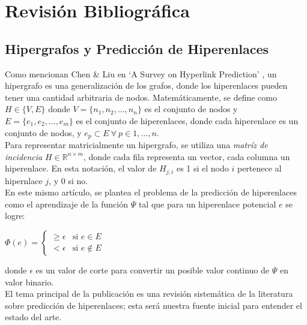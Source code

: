 \chapter{Revisión Bibliográfica}

\section{Hipergrafos y Predicción de Hiperenlaces}

Como mencionan Chen \& Liu en `A Survey on Hyperlink Prediction' \cite{Chen_2024}, un hipergrafo es una generalización de los grafos, donde los hiperenlaces pueden tener una cantidad arbitraria de nodos.
Matemáticamente, se define como \begin{math} H \in \{V,E\}\end{math} donde $V=\{n_{1},n_{2},...,n_{n}\}$ es el conjunto de nodos y $E=\{e_{1},e_{2},\dots,e_{m}\}$ es el conjunto de hiperenlaces, donde cada hiperenlace es un conjunto de nodos, y $e_{p} \subset E \: \forall \: p \in 1,\dots,n$.\\

Para representar matricialmente un hipergrafo, se utiliza una \textit{matríz de incidencia} $H \in \mathbb{R}^{n \times m}$, donde cada fila representa un vector, cada columna un hiperenlace. En esta notación, el valor de $H_{j,i}$ es 1 si el nodo $i$ pertenece al hipernlace $j$, y 0 si no.\\

En este mismo artículo, se plantea el problema de la predicción de hiperenlaces como el aprendizaje de la función $\Psi $ tal que para un hiperenlace potencial $e$ se logre:

\begin{center}
    \begin{math}
        \Phi (e) = 
        \begin{cases}
            \geq \epsilon &\text{si $e \in E$}\\
            < \epsilon &\text{si $e \notin E$}
        \end{cases}
    \end{math}
\end{center}

donde $\epsilon$ es un valor de corte para convertir un posible valor continuo de $\Psi$ en valor binario.\\

El tema principal de la publicación es una revisión sistemática de la literatura sobre predicción de hiperenlaces; esta será nuestra fuente inicial para entender el estado del arte.\\

